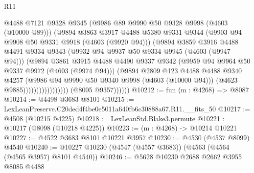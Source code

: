\begin{lexlean}{R11}
\begin{coremodule}
                                      @4488
                                      @7121
                                      @9328
                                      @9345
                                      (@9986 @89 @9990 @50 @9328 @9998 (@4603 (@10000 @89)))
                                      (@9894
                                        @3863
                                        @3917
                                        @4488
                                        @5380
                                        @9331
                                        @9344
                                        (@9903 @94 @9908 @50 @9331 @9918 (@4603 (@9920 @94)))
                                        (@9894
                                          @3859
                                          @3916
                                          @4488
                                          @4491
                                          @9334
                                          @9343
                                          (@9932 @94 @9937 @50 @9334 @9945 (@4603 (@9947 @94)))
                                          (@9894
                                            @3861
                                            @3915
                                            @4488
                                            @4490
                                            @9337
                                            @9342
                                            (@9959 @94 @9964 @50 @9337 @9972 (@4603 (@9974 @94)))
                                            (@9894
                                              @2809
                                              @123
                                              @4488
                                              @4488
                                              @9340
                                              @4257
                                              (@9986 @94 @9990 @50 @9340 @9998 (@4603 (@10000 @94)))
                                              (@4623 @9885)))))))))))))))))
              (@8005 @9357))))))
@10212 := fun (m : @4268) => @8087
@10214 := @4498 @3683 @8101
@10215 := LexLeanPreserve.C20ded4f4be0e5011a640fb6c30888a67.R11.__fits_50
@10217 := @4508 (@10215 @4225)
@10218 := LexLeanStd.Blake3.permute
@10221 := @10217 (@8098 (@10218 @4225))
@10223 := (m : @4268) -> @10214 @10221
@10227 := @4522 @3683 @8101 @10221 @3957
@10230 := @4530 (@4537 @8099) @4540
@10240 := @10227 @10230 (@4547 (@4557 @3683)) (@4563 (@4564 (@4565 @3957) @8101 @4540))
@10246 := @5628 @10230 @2688 @2662 @3955 @8085 @4488

\end{coremodule}
\end{lexlean}
